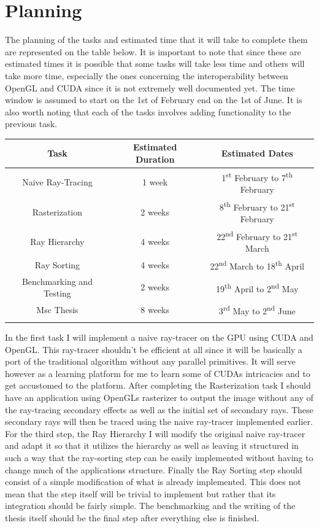 \documentclass{llncs}
\begin{document}
%
\section{Planning}
%

The planning of the tasks and estimated time that it will take to complete them are represented on the table below. It is important to note that since these are estimated times it is possible that some tasks will take less time and others will take more time, especially the ones concerning the interoperability between OpenGL and CUDA since it is not extremely well documented yet.
The time window is assumed to start on the 1st of February end on the 1st of June. It is also worth noting that each of the tasks involves adding functionality to the previous task.

\begin{table}
\centering
\begin{tabular}{c c c}
\hline\noalign{\smallskip}
Task & Estimated Duration & Estimated Dates \\ \hline\noalign{\smallskip}
Naive Ray-Tracing & 1 week & 1\textsuperscript{st} February to 7\textsuperscript{th} February\\
Rasterization & 2 weeks & 8\textsuperscript{th} February to 21\textsuperscript{st} February\\
Ray Hierarchy & 4 weeks & 22\textsuperscript{nd} February to 21\textsuperscript{st} March\\
Ray Sorting & 4 weeks & 22\textsuperscript{nd} March to 18\textsuperscript{th} April\\
Benchmarking and Testing & 2 weeks & 19\textsuperscript{th} April to 2\textsuperscript{nd} May\\
Msc Thesis & 8 weeks & 3\textsuperscript{rd} May to 2\textsuperscript{nd} June\\ \hline\noalign{\smallskip}
\end{tabular}
\end{table}

In the first task I will implement a naive ray-tracer on the GPU using CUDA and OpenGL. This ray-tracer shouldn't be efficient at all since it will be basically a port of the traditional algorithm without any parallel primitives. It will serve however as a learning platform for me to learn some of CUDAs intricacies and to get accustomed to the platform.
After completing the Rasterization task I should have an application using OpenGLs rasterizer to output the image without any of the ray-tracing secondary effects as well as the initial set of secondary rays. These secondary rays will then be traced using the naive ray-tracer implemented earlier.
For the third step, the Ray Hierarchy I will modify the original naive ray-tracer and adapt it so that it utilizes the hierarchy as well as leaving it structured in such a way that the ray-sorting step can be easily implemented without having to change much of the applications structure. Finally the Ray Sorting step should consist of a simple modification of what is already  implemented. This does not mean that the step itself will be trivial to implement but rather that its integration should be fairly simple. The benchmarking and the writing of the thesis itself should be the final step after everything else is finished.
\end{document}
